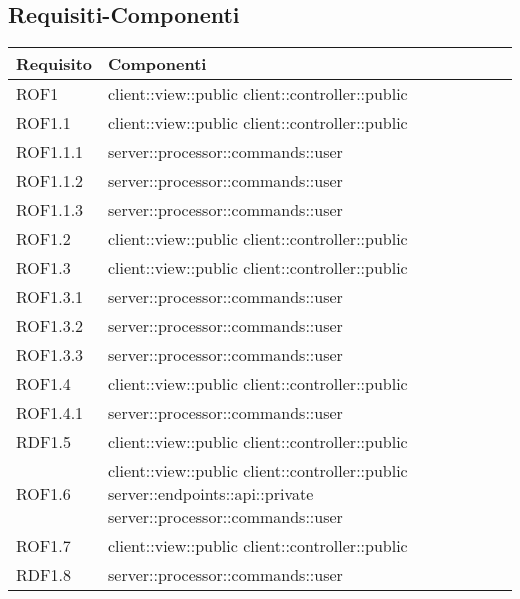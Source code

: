 \subsection{Requisiti-Componenti} %
\label{sub:componenti_requisiti}
\begin{center}
\def\arraystretch{1.5}
\bgroup
\begin{longtable}{| p{4cm} | p{8cm} |}
\hline
\textbf{Requisito} & \textbf{Componenti} \\
\hline
ROF1 & client::view::public \newline client::controller::public \\
\hline
ROF1.1 & client::view::public \newline client::controller::public \\
\hline
ROF1.1.1 & server::processor::commands::user \\
\hline
ROF1.1.2 & server::processor::commands::user \\
\hline
ROF1.1.3 & server::processor::commands::user \\
\hline
ROF1.2 & client::view::public \newline client::controller::public \\
\hline
ROF1.3 & client::view::public \newline client::controller::public \\
\hline
ROF1.3.1 & server::processor::commands::user \\
\hline
ROF1.3.2 & server::processor::commands::user \\
\hline
ROF1.3.3 & server::processor::commands::user \\
\hline
ROF1.4 & client::view::public \newline client::controller::public \\
\hline
ROF1.4.1 & server::processor::commands::user \\
\hline
RDF1.5 & client::view::public \newline client::controller::public \\
\hline
ROF1.6 & client::view::public \newline client::controller::public \newline server::endpoints::api::private \newline server::processor::commands::user \\
\hline
ROF1.7 & client::view::public \newline client::controller::public \\
\hline
RDF1.8 & server::processor::commands::user \\

\end{longtable}
\end{center}
